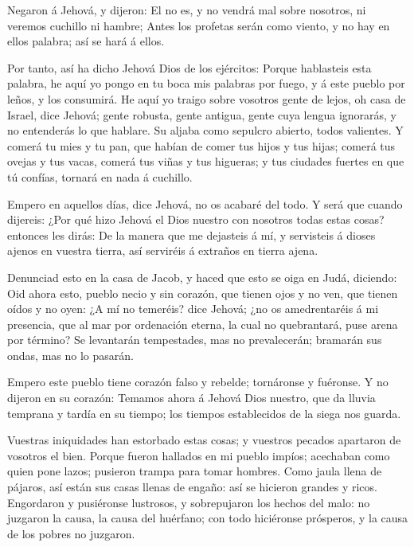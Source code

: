  Negaron á Jehová, y dijeron: El no es, y no vendrá mal
sobre nosotros, ni veremos cuchillo ni hambre;  Antes los
profetas serán como viento, y no hay en ellos palabra; así se hará á
ellos.

 Por tanto, así ha dicho Jehová Dios de los ejércitos:
Porque hablasteis esta palabra, he aquí yo pongo en tu boca mis palabras
por fuego, y á este pueblo por leños, y los consumirá.  He
aquí yo traigo sobre vosotros gente de lejos, oh casa de Israel, dice
Jehová; gente robusta, gente antigua, gente cuya lengua ignorarás, y no
entenderás lo que hablare.  Su aljaba como sepulcro
abierto, todos valientes.  Y comerá tu mies y tu pan, que
habían de comer tus hijos y tus hijas; comerá tus ovejas y tus vacas,
comerá tus viñas y tus higueras; y tus ciudades fuertes en que tú
confías, tornará en nada á cuchillo.

 Empero en aquellos días, dice Jehová, no os acabaré del
todo.  Y será que cuando dijereis: ¿Por qué hizo Jehová el
Dios nuestro con nosotros todas estas cosas? entonces les dirás: De la
manera que me dejasteis á mí, y servisteis á dioses ajenos en vuestra
tierra, así serviréis á extraños en tierra ajena.

 Denunciad esto en la casa de Jacob, y haced que esto se
oiga en Judá, diciendo:  Oid ahora esto, pueblo necio y sin
corazón, que tienen ojos y no ven, que tienen oídos y no oyen:
 ¿A mí no temeréis? dice Jehová; ¿no os amedrentaréis á mi
presencia, que al mar por ordenación eterna, la cual no quebrantará,
puse arena por término? Se levantarán tempestades, mas no prevalecerán;
bramarán sus ondas, mas no lo pasarán.

 Empero este pueblo tiene corazón falso y rebelde;
tornáronse y fuéronse.  Y no dijeron en su corazón: Temamos
ahora á Jehová Dios nuestro, que da lluvia temprana y tardía en su
tiempo; los tiempos establecidos de la siega nos guarda.

 Vuestras iniquidades han estorbado estas cosas; y vuestros
pecados apartaron de vosotros el bien.  Porque fueron
hallados en mi pueblo impíos; acechaban como quien pone lazos; pusieron
trampa para tomar hombres.  Como jaula llena de pájaros,
así están sus casas llenas de engaño: así se hicieron grandes y ricos.
 Engordaron y pusiéronse lustrosos, y sobrepujaron los
hechos del malo: no juzgaron la causa, la causa del huérfano; con todo
hiciéronse prósperos, y la causa de los pobres no juzgaron.

